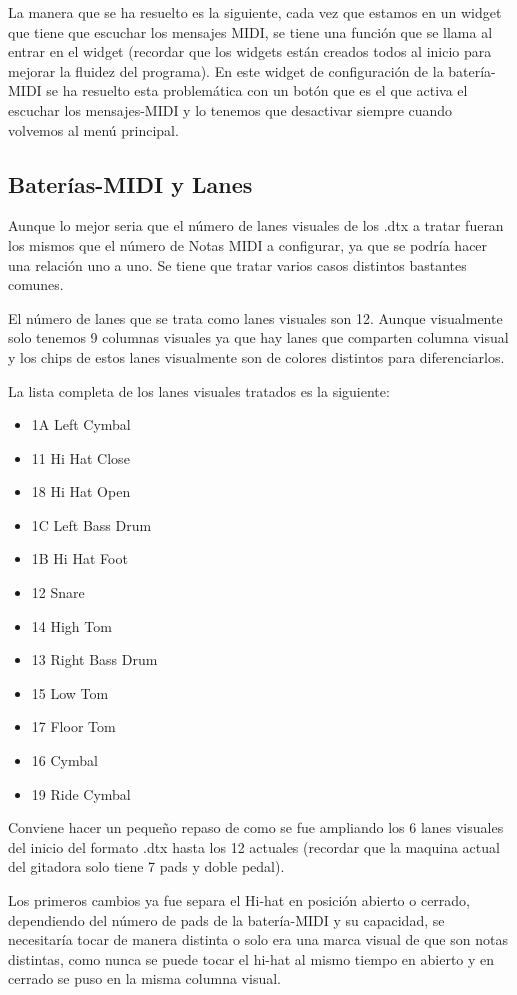 \documentclass[a4paper,11pt,oneside]{book}
\begin{document}
La manera que se ha resuelto es la siguiente, cada vez que estamos en un widget que tiene que escuchar los mensajes MIDI, se tiene una función que se llama al entrar en el widget (recordar que los widgets están creados todos al inicio para mejorar la fluidez del programa). En este widget de configuración de la batería-MIDI se ha resuelto esta problemática con un botón que es el que activa el escuchar los mensajes-MIDI y lo tenemos que desactivar siempre cuando volvemos al menú principal.


\subsection{Baterías-MIDI y Lanes}
Aunque lo mejor seria que el número de lanes visuales de los .dtx a tratar fueran los mismos que el número de Notas MIDI a configurar, ya que se podría hacer una relación uno a uno. Se tiene que tratar varios casos distintos bastantes comunes.

El número de lanes que se trata como lanes visuales son 12. Aunque visualmente solo tenemos 9 columnas visuales ya que hay lanes que comparten columna visual y los chips de estos lanes visualmente son de colores distintos para diferenciarlos.

La lista completa de los lanes visuales tratados es la siguiente:

\begin{itemize}
   \item 1A Left Cymbal
   \item 11 Hi Hat Close
   \item 18 Hi Hat Open
   \item 1C Left Bass Drum
   \item 1B Hi Hat Foot
   \item 12 Snare
   \item 14 High Tom
   \item 13 Right Bass Drum
   \item 15 Low Tom
   \item 17 Floor Tom
   \item 16 Cymbal
   \item 19 Ride Cymbal
 \end{itemize}

Conviene hacer un pequeño repaso de como se fue ampliando los 6 lanes visuales del inicio del formato .dtx hasta los 12 actuales (recordar que la maquina actual del gitadora solo tiene 7 pads y doble pedal).

Los primeros cambios ya fue separa el Hi-hat en posición abierto o cerrado, dependiendo del número de pads de la batería-MIDI y su capacidad, se necesitaría tocar de manera distinta o solo era una marca visual de que son notas distintas, como nunca se puede tocar el hi-hat al mismo tiempo en abierto y en cerrado se puso en la misma columna visual.
\end{document}
